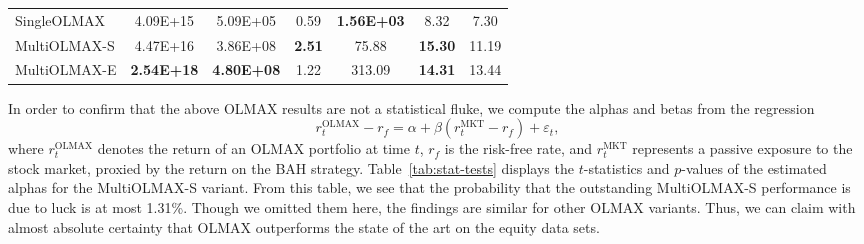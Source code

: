 \begin{table}[H]
{\begin{tabular}{lcccccc}
	SingleOLMAX & 4.09E+15 & 5.09E+05 & 0.59 & \textbf{1.56E+03} & 8.32 & 7.30 \\
	MultiOLMAX-S & 4.47E+16 & 3.86E+08 & \textbf{2.51} & 75.88 & \textbf{15.30} & 11.19 \\
	MultiOLMAX-E & \textbf{2.54E+18} & \textbf{4.80E+08} & 1.22 & 313.09 & \textbf{14.31} & 13.44 \\
    \bottomrule
  \end{tabular}}
\end{table}
In order to confirm that the above OLMAX results are not a statistical fluke, we compute the alphas and betas from the regression
\begin{equation}
	r_t^\text{OLMAX} - r_f
	= \alpha + \beta(r_t^\text{MKT} - r_f) + \varepsilon_t,
\end{equation}
where $r_t^\text{OLMAX}$ denotes the return of an OLMAX portfolio at time $t$, $r_f$ is the risk-free rate, and $r_t^\text{MKT}$ represents a passive exposure to the stock market, proxied by the return on the BAH strategy. Table~\ref{tab:stat-tests} displays the $t$-statistics and $p$-values of the estimated alphas for the MultiOLMAX-S variant. From this table, we see that the probability that the outstanding MultiOLMAX-S performance is due to luck is at most 1.31\%. Though we omitted them here, the findings are similar for other OLMAX variants. Thus, we can claim with almost absolute certainty that OLMAX outperforms the state of the art on the equity data sets.

